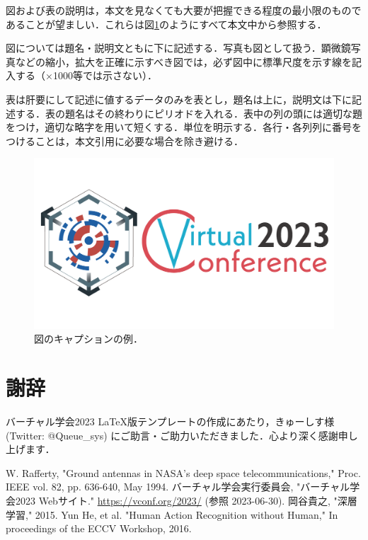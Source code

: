 \documentclass[10pt,a4paper,autodetect-engine,dvipdfmx]{jsarticle} %
\begin{document}
\begin{multicols}{2}
図および表の説明は，本文を見なくても大要が把握できる程度の最小限のものであることが望ましい．これらは図\ref{fig:sample_figure}のようにすべて本文中から参照する．

図については題名・説明文ともに下に記述する．写真も図として扱う．顕微鏡写真などの縮小，拡大を正確に示すべき図では，必ず図中に標準尺度を示す線を記入する（×1000等では示さない）．

表は肝要にして記述に値するデータのみを表とし，題名は上に，説明文は下に記述する．表の題名はその終わりにピリオドを入れる．表中の列の頭には適切な題をつけ，適切な略字を用いて短くする．単位を明示する．各行・各列列に番号をつけることは，本文引用に必要な場合を除き避ける．

\begin{figure}[H]
\centering
\includegraphics[width=0.95\linewidth]{vconf2023.png}
\caption{図のキャプションの例．}
\label{fig:sample_figure}
\end{figure}

\section*{謝辞}

バーチャル学会2023 LaTeX版テンプレートの作成にあたり，きゅーしす様 (Twitter: @Queue\_sys) にご助言・ご助力いただきました．心より深く感謝申し上げます．


\begin{thebibliography}{9}
 W. Rafferty, "Ground antennas in NASA’s deep space telecommunications," Proc. IEEE vol. 82, pp. 636-640, May 1994.
 バーチャル学会実行委員会, "バーチャル学会2023 Webサイト." \url{https://vconf.org/2023/} (参照 2023-06-30).
 岡谷貴之, "深層学習," 2015.
 Yun He, et al. "Human Action Recognition without Human," In proceedings of the ECCV Workshop, 2016.
\end{thebibliography}

\end{multicols}
\end{document}
